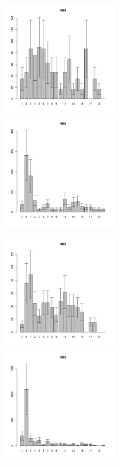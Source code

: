 \begin{figure}[h]
\begin{multicols}{3}
\hfill
\includegraphics[width=60mm]{../White_Sea/Luvenga_II_razrez/low_beatch_1994_.pdf}
\hfill
\includegraphics[width=60mm]{../White_Sea/Luvenga_II_razrez/low_beatch_1998_.pdf}

\end{multicols}


\begin{multicols}{3}
\hfill
\includegraphics[width=60mm]{../White_Sea/Luvenga_II_razrez/low_beatch_1995_.pdf}
\hfill
\includegraphics[width=60mm]{../White_Sea/Luvenga_II_razrez/low_beatch_1999_.pdf}


\end{multicols}
\end{figure}
